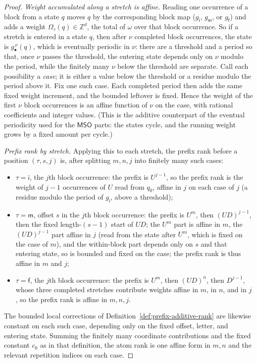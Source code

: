 \documentclass[11pt]{article}
\theoremstyle{definition}
\newcommand{\Z}{\mathbb Z}
\newcommand{\MSO}{\mathsf{MSO}}
\begin{document}
\begin{proof}
\vspace{0.5em}
\noindent\emph{Weight accumulated along a stretch is affine.}  Reading one occurrence of a block
from a state $q$ moves $q$ by the corresponding block map ($g_{\mathsf i}$,
$g_{\mathsf m}$, or $g_{\mathsf f}$) and adds a weight $\Omega_\tau(q)\in\Z^d$, the
total of $\omega$ over that block occurrence.  So if a stretch is entered in a state $q$, then
after $\nu$ completed block occurrences, the state is
$g_\bullet^{\,\nu}(q)$, which is eventually periodic in $\nu$: there are a threshold and a period so that, once $\nu$ passes the
threshold, the entering state depends only on $\nu$ modulo the period, while the
finitely many $\nu$ below the threshold are separate.  Call each possibility a
\emph{case}; it is either a value below the threshold or a residue modulo the
period above it.  Fix one such case.  Each completed period then adds the same
fixed weight increment, and the bounded leftover is fixed.  Hence the weight
of the first $\nu$ block occurrences is an affine function of $\nu$ on the
case, with rational coefficients and integer values.  (This is
the additive counterpart of the eventual periodicity used for the $\MSO$
parts: the states cycle, and the running weight grows by a fixed amount per
cycle.)

\vspace{0.5em}
\noindent\emph{Prefix rank by stretch.}  Applying this to each stretch, the prefix rank
before a position $(\tau,s,j)$ is, after splitting $m,n,j$ into finitely many such
cases:
\begin{itemize}
\item $\tau=\mathsf i$, the $j$th block occurrence: the prefix is $U^{j-1}$, so the prefix rank is the
weight of $j-1$ occurrences of $U$ read from $q_0$, affine in $j$ on each case of $j$
(a residue modulo the period of $g_{\mathsf i}$, above a threshold);
\item $\tau=\mathsf m$, offset $s$ in the $j$th block occurrence: the prefix is $U^m$, then
$(UD)^{j-1}$, then the fixed length-$(s-1)$ start of $UD$; the $U^m$ part is affine
in $m$, the $(UD)^{j-1}$ part affine in $j$ (read from the state after $U^m$, which
is fixed on the case of $m$), and the within-block part depends only on $s$
and that entering state, so is bounded and fixed on the case; the prefix rank
is thus affine in $m$ and $j$;
\item $\tau=\mathsf f$, the $j$th block occurrence: the prefix is $U^m$, then $(UD)^n$, then
$D^{j-1}$, whose three completed stretches contribute weights affine in $m$, in
$n$, and in $j$, so the prefix rank is affine in $m,n,j$.
\end{itemize}
The bounded local corrections of Definition~\ref{def:prefix-additive-rank} are
likewise constant on each such case, depending only on the fixed offset,
letter, and entering state.  Summing the finitely many coordinate contributions
and the fixed constant $c_0$ as in that definition, the atom rank is one affine
form in $m,n$ and the relevant repetition indices on each case.


\end{proof}
\end{document}
